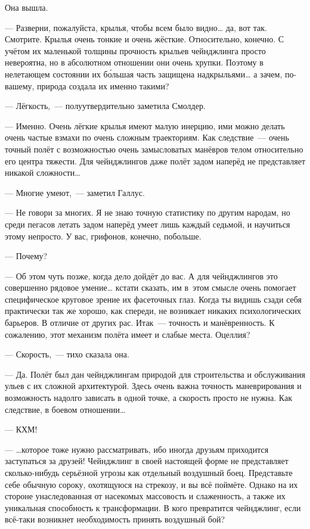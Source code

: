 \documentclass[fontsize=11pt,a5paper,titlepage=firstcover]{scrbook}
\begin{document}
Она вышла.

--- Разверни, пожалуйста, крылья, чтобы всем было видно{\ldots} да, вот так. Смотрите. Крылья очень тонкие и очень жёсткие. Относительно, конечно. С учётом их маленькой толщины прочность крыльев чейнджлинга просто невероятна, но в абсолютном отношении они очень хрупки. Поэтому в нелетающем состоянии их бо́льшая часть защищена надкрыльями{\ldots} а зачем, по-вашему, природа создала их именно такими?

--- Лёгкость,~--- полуутвердительно заметила Смолдер.

--- Именно. Очень лёгкие крылья имеют малую инерцию, ими можно делать очень частые взмахи по очень сложным траекториям. Как следствие~--- очень точный полёт с возможностью очень замысловатых манёвров телом относительно его центра тяжести. Для чейнджлингов даже полёт задом наперёд не представляет никакой сложности{\ldots}

--- Многие умеют,~--- заметил Галлус.

--- Не говори за многих. Я не знаю точную статистику по другим народам, но среди пегасов летать задом наперёд умеет лишь каждый седьмой, и научиться этому непросто. У вас, грифонов, конечно, побольше.

--- Почему?

--- Об этом чуть позже, когда дело дойдёт до вас. А для чейнджлингов это совершенно рядовое умение{\ldots} кстати сказать, им в~этом смысле очень помогает специфическое круговое зрение их фасеточных глаз. Когда ты видишь сзади себя практически так же хорошо, как спереди, не возникает никаких психологических барьеров. В отличие от других рас. Итак~--- точность и манёвренность. К сожалению, этот механизм полёта имеет и слабые места. Оцеллия?

--- Скорость,~--- тихо сказала она.

--- Да. Полёт был дан чейнджлингам природой для строительства и обслуживания ульев с их сложной архитектурой. Здесь очень важна точность маневрирования и возможность надолго зависать в одной точке, а скорость просто не нужна. Как следствие, в боевом отношении{\ldots}

--- КХМ!

--- {\ldots}которое тоже нужно рассматривать, ибо иногда друзьям приходится заступаться за друзей! Чейнджлинг в своей настоящей форме не представляет сколько-нибудь серьёзной угрозы как отдельный воздушный боец. Представьте себе обычную сороку, охотящуюся на стрекозу, и вы всё поймёте. Однако на их стороне унаследованная от насекомых массовость и слаженность, а также их уникальная способность к трансформации. В кого превратится чейнджлинг, если всё-таки возникнет необходимость принять воздушный бой?
\end{document}
